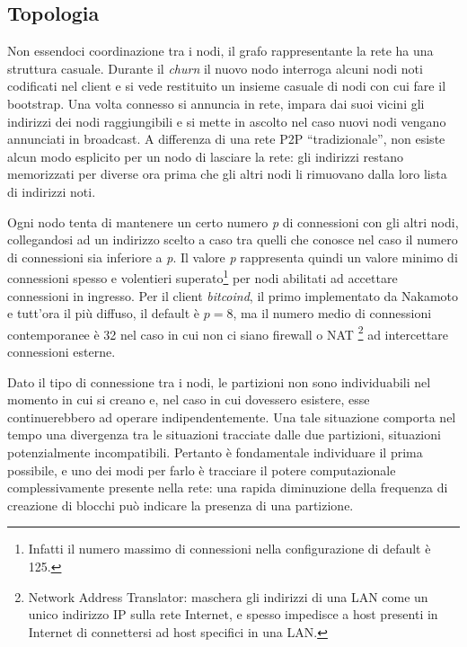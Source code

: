 \subsection{Topologia}\label{topologia}

Non essendoci coordinazione tra i nodi, il grafo rappresentante la rete ha una struttura casuale. Durante il \emph{churn} il nuovo nodo interroga alcuni nodi noti codificati nel client e si vede restituito un insieme casuale di nodi con cui fare il bootstrap. Una volta connesso si annuncia in rete, impara dai suoi vicini gli indirizzi dei nodi raggiungibili e si mette in ascolto nel caso nuovi nodi vengano annunciati in broadcast. A differenza di una rete P2P ``tradizionale'', non esiste alcun modo esplicito per un nodo di lasciare la rete: gli indirizzi restano memorizzati per diverse ora prima che gli altri nodi li rimuovano dalla loro lista di indirizzi noti.

Ogni nodo tenta di mantenere un certo numero \emph{p} di connessioni con gli altri nodi, collegandosi ad un indirizzo scelto a caso tra quelli che conosce nel caso il numero di connessioni sia inferiore a \emph{p}. Il valore \emph{p} rappresenta quindi un valore minimo di connessioni spesso e volentieri superato\footnote{Infatti il numero massimo di connessioni nella configurazione di default è 125.} per nodi abilitati ad accettare connessioni in ingresso. Per il client \emph{bitcoind}, il primo implementato da Nakamoto e tutt'ora il più diffuso, il default è $p=8$, ma il numero medio di connessioni contemporanee è 32 nel caso in cui non ci siano firewall o NAT \footnote{Network Address Translator: maschera   gli indirizzi di una LAN come un unico indirizzo IP sulla rete   Internet, e spesso impedisce a host presenti in Internet di   connettersi ad host specifici in una LAN.} ad intercettare connessioni esterne.

Dato il tipo di connessione tra i nodi, le partizioni non sono individuabili nel momento in cui si creano e, nel caso in cui dovessero esistere, esse continuerebbero ad operare indipendentemente. Una tale situazione comporta nel tempo una divergenza tra le situazioni tracciate dalle due partizioni, situazioni potenzialmente incompatibili. Pertanto è fondamentale individuare il prima possibile, e uno dei modi per farlo è tracciare il potere computazionale complessivamente presente nella rete: una rapida diminuzione della frequenza di creazione di blocchi può indicare la presenza di una partizione.

